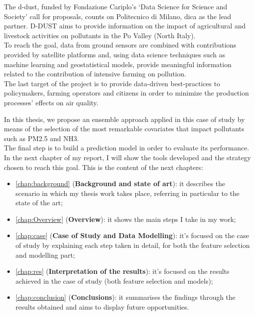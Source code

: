 The \gls{d-dust}, funded by Fondazione Cariplo’s ‘Data Science for Science and Society’ call for proposals, counts on Politecnico di Milano, \gls{dica} as the lead partner.\newline
D-DUST aims to provide information on the impact of agricultural and livestock activities on pollutants in the Po Valley (North Italy).\\ 
To reach the goal, data from ground sensors are combined with contributions provided by satellite platforms and, using data science techniques such as machine learning and geostatistical models, provide meaningful information related to the contribution of intensive farming on pollution.\\
The last target of the project is to provide data-driven best-practices to policymakers, farming operators and citizens in order to minimize the production processes' effects on air quality.\par\par
In this thesis, we propose an ensemble approach applied in this case of study by means of the selection of the most remarkable covariates that impact pollutants such as PM2.5 and NH3. \\
The final step is to build a prediction model in order to evaluate its performance. \\ 
In the next chapter of my report, I will show the tools developed and the strategy chosen to reach this goal. 
This is the content of the next chapters:

\begin{itemize}
  \item \autoref{chap:background} (\textbf{Background and state of art}): it describes the scenario in which my thesis work takes place, referring in particular to the state of the art;
  \item \autoref{chap:Overview} (\textbf{Overview}): it shows the main steps I take in my work;
  \item \autoref{chap:case} (\textbf{Case of Study and Data Modelling}): it's focused on the case of study by explaining each step taken in detail, for both the feature selection and modelling part;
 \item \autoref{chap:res} (\textbf{Interpretation of the results}): it's focused on the results achieved in the case of study (both feature selection and models);
 \item \autoref{chap:conclusion} (\textbf{Conclusions}): it summarises the findings through the results obtained and aims to display future opportunities.  
\end{itemize}

